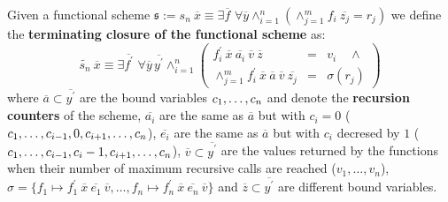 \begin{defn}
  Given a functional scheme $\mathfrak{s} := s_n\ \overline{x} \equiv \exists \overline{f}\,\,\forall \overline{y} \land_{i=1}^n(\land_{j=1}^m f_i\ \overline{z_j} = r_j)$ we define the {\bf terminating closure of the functional scheme} as:
  $$
  \widetilde{s_n}\ \overline{x} \equiv \exists \overline{f^\prime}\,\,\forall \overline{y}\,\overline{y^\prime} 
  \land_{i=1}^n\left(
  \begin{array}{rcl}
    f_i^\prime\ \overline{x}\ \overline{a_i}\ \overline{v}\ \overline{z} &=& v_i \quad \land\\
    \land_{j=1}^m f_i^\prime\ \overline{x}\ \overline{a}\ \overline{v}\ \overline{z_j} &=& \sigma(r_j)
  \end{array}
  \right)
  $$
  where $\overline{a} \subset \overline{y^\prime}$ are the bound variables $c_1,\- \ldots\-, c_n$ and denote the {\bf recursion counters} of the scheme, $\overline{a_i}$ are the same as $\overline{a}$ but with $c_i = 0$ ($c_1,\-\ldots,\-c_{i-1},\-0,\-c_{i+1},\-\ldots,\-c_n$), $\overline{e_i}$ are the same as $\overline{a}$ but with $c_i$ decresed by $1$ ($c_1,\-\ldots,\-c_{i-1},\-c_i-1,\-c_{i+1},\-\ldots,\-c_n$), $\overline{v} \subset \overline{y^\prime}$ are the values returned by the functions when their number of maximum recursive calls are reached ($v_1, \ldots, v_n$), $\sigma = \{f_1 \mapsto f_1^\prime\ \overline{x}\ \overline{e_1}\ \overline{v}, \ldots, f_n \mapsto f_n^\prime\ \overline{x}\ \overline{e_n}\ \overline{v}\}$ and $\overline{z} \subset \overline{y^\prime}$ are different bound variables.
\end{defn}

